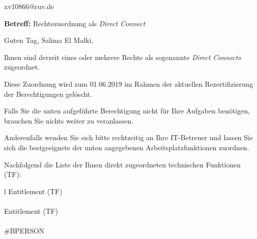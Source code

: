 \documentclass[a4paper,landscape,12pt]{letter}
\begin{document}
\begin{letter}{xv10866@ruv.de\hfill \break}
\begin{normalsize}
	\opening{\textbf{Betreff:} Rechtezuordnung als \emph{Direct Connect}}
	\begin{normalsize} \hfill
	\end{normalsize}

	\begin{normalsize}
		Guten Tag, 
	Salima El Malki, \hfill \break
	\end{normalsize}
	\end{normalsize}
	
\begin{normalsize}
	Ihnen sind derzeit eines oder mehrere Rechte als sogenannte \emph{Direct Connects} zugeordnet.
	
	Diese Zuordnung wird zum 01.06.2019 im Rahmen der aktuellen Rezertifizierung der Berechtigungen gelöscht.
	
	Falls Sie die unten aufgeführte Berechtigung nicht für Ihre Aufgaben benötigen, 
	brauchen Sie nichts weiter zu veranlassen.
	
	Anderenfalls wenden Sie sich bitte rechtzeitig an Ihre IT-Betreuer 
	und lassen Sie sich die bestgeeignete der unten angegebenen Arbeitsplatzfunktionen zuordnen.
	\end{normalsize}
	
\begin{normalsize}
	Nachfolgend die Liste der Ihnen direkt zugeordneten technischen Funktionen (TF):

	\begin{longtable}{l}
		Entitlement (TF) \\ \hline
		\endfirsthead
		\\\hline
		Entitlement (TF) \\ \hline
		\endhead %
		\multicolumn{1}{r@{}}{Fortsetzung \ldots}\\
		\endfoot
		\hline
		\endlastfoot
	\#BPERSON\\
	\end{longtable}
	\end{normalsize}
	

\end{letter}
\end{document}
